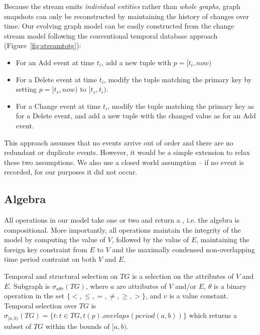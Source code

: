 Because the stream emits {\em individual entities} rather than {\em
  whole graphs}, graph snapshots can only be reconstructed by
maintaining the history of changes over time.  Our evolving graph
model can be easily constructed from the change stream model following
the conventional temporal database approach
(Figure~\ref{fig:streamtotg}):
\begin{itemize}[noitemsep,topsep=0pt]
\item For an Add event at time $t_i$, add a new tuple with $p=[t_i,
  now)$
\item For a Delete event at time $t_i$, modify the tuple matching the
  primary key by setting $p=[t_s, now)$ to $[t_s, t_i)$.
\item For a Change event at time $t_i$, modify the tuple matching the
  primary key as for a Delete event, and add a new tuple with the
  changed value as for an Add event.
\end{itemize}

This approach assumes that no events arrive out of order and there are
no redundant or duplicate events.  However, it would be a simple
extension to relax these two assumptions.  We also use a closed world
assumption -- if no event is recorded, for our purposes it did not
occur.

\subsection{Algebra}
\label{sec:model:algebra}

All operations in our model take one or two \tgs and return a \tg,
i.e. the algebra is compositional.  More importantly, all operations
maintain the integrity of the model by computing the value of $V$,
followed by the value of $E$, maintaining the foreign key constraint
from $E$ to $V$ and the maximally condensed non-overlapping time
period contraint on both $V$ and $E$.

\begin{definition}[Selection]
Temporal and structural selection on $TG$ is a selection on the
attributes of $V$ and $E$.  Subgraph is $\sigma_{a \theta v}(TG)$,
where $a$ are attributes of $V$ and/or $E$, $\theta$ is a binary
operation in the set $\{<, \leq, =, \neq, \geq, >\}$, and $v$ is a
value constant.  Temporal selection over $TG$ is $\sigma_{[a,b)}(TG) =
  \{t: t \in TG, t(p).overlaps(period(a,b))\}$ which returns a subset
  of $TG$ within the bounds of $[a,b)$.
\label{def:selection}
\end{definition}

